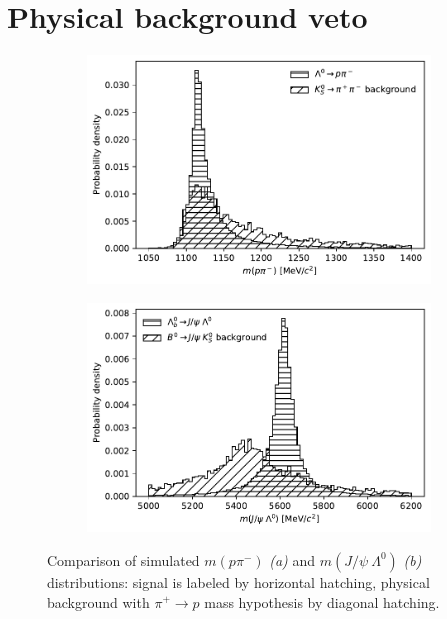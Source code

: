 \section{Physical background veto}
\label{sec:B0_veto}
\begin{figure}[t]
	\centering
	\begin{subfigure}{.45\textwidth}
		\includegraphics[width=\textwidth]{graphics/04-event_selection/phys_bkg_lambda_comparison.pdf}
		\caption{}
	\end{subfigure}
	\begin{subfigure}{.45\textwidth}
		\includegraphics[width=\textwidth]{graphics/04-event_selection/phys_bkg_lambdab_comparison.pdf}
		\caption{}
	\end{subfigure}
	\caption[Comparison of simulated $m(p\pi^-)$ \textit{(a)} and $m(J/\psi~\Lambda^0)$ distributions for simulated \demonstratorshort signal and \physbkgshort physical background with proton mass hypothesis.]{Comparison of simulated $m(p\pi^-)$ \textit{(a)} and $m(J/\psi~\Lambda^0)$ \textit{(b)} distributions: \demonstratorshort signal is labeled by horizontal hatching, \physbkgshort physical background with $\pi^+ \rightarrow p$ mass hypothesis by diagonal hatching.}
\end{figure}

